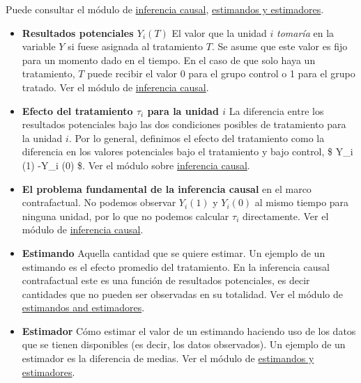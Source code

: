 \documentclass[12pt,spanish,]{book}
\begin{document}
Puede consultar el módulo de \href{inferencia-causal.html}{inferencia causal}, \href{estimandos-y-estimadores.html}{estimandos y estimadores}.

\begin{itemize}
\item
  \textbf{Resultados potenciales \(Y_i(T)\)} El valor que la unidad \(i\) \emph{tomaría} en la variable \(Y\) si fuese asignada al tratamiento \(T\). Se asume que este valor es fijo para un momento dado en el tiempo. En el caso de que solo haya un tratamiento, \(T\) puede recibir el valor 0 para el grupo control o 1 para el grupo tratado. Ver el módulo de \href{inferencia-causal.html}{inferencia causal}.
\item
  \textbf{Efecto del tratamiento \(\tau_i\) para la unidad \(i\)} La diferencia entre los resultados potenciales bajo las dos condiciones posibles de tratamiento para la unidad \(i\). Por lo general, definimos el efecto del tratamiento como la diferencia en los valores potenciales bajo el tratamiento y bajo control, \$ Y\_i (1) -Y\_i (0) \$. Ver el módulo sobre \href{inferencia-causal.html}{inferencia causal}.
\item
  \textbf{El problema fundamental de la inferencia causal} en el marco contrafactual. No podemos observar \(Y_i(1)\) y \(Y_i(0)\) al mismo tiempo para ninguna unidad, por lo que no podemos calcular \(\tau_i\) directamente. Ver el módulo de \href{inference-causal.html}{inferencia causal}.
\item
  \textbf{Estimando} Aquella cantidad que se quiere estimar. Un ejemplo de un estimando es el efecto promedio del tratamiento. En la inferencia causal contrafactual este es una función de resultados potenciales, es decir cantidades que no pueden ser observadas en su totalidad. Ver el módulo de \href{estimandos-y-estimadores.html}{estimandos and estimadores}.
\item
  \textbf{Estimador} Cómo estimar el valor de un estimando haciendo uso de los datos que se tienen disponibles (es decir, los datos observados). Un ejemplo de un estimador es la diferencia de medias. Ver el módulo de \href{estimandos-y-estimadores.html}{estimandos y estimadores}.


\end{itemize}
\end{document}
